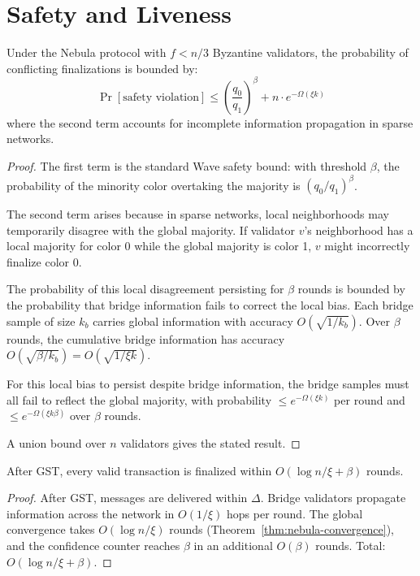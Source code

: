\section{Safety and Liveness}

\label{sec:safety}

\begin{theorem}
\label{thm:nebula-safety}
Under the Nebula protocol with $f < n/3$ Byzantine validators, the probability of
conflicting finalizations is bounded by:
\[
\Pr[\text{safety violation}] \leq \left(\frac{q_0}{q_1}\right)^{\beta} + n \cdot e^{-\Omega(\xi k)}
\]
where the second term accounts for incomplete information propagation in sparse networks.
\end{theorem}

\begin{proof}
The first term is the standard Wave safety bound: with threshold $\beta$, the probability
of the minority color overtaking the majority is $(q_0/q_1)^\beta$.

The second term arises because in sparse networks, local neighborhoods may temporarily
disagree with the global majority. If validator $v$'s neighborhood has a local majority
for color 0 while the global majority is color 1, $v$ might incorrectly finalize color 0.

The probability of this local disagreement persisting for $\beta$ rounds is bounded by
the probability that bridge information fails to correct the local bias. Each bridge
sample of size $k_b$ carries global information with accuracy $O(\sqrt{1/k_b})$. Over
$\beta$ rounds, the cumulative bridge information has accuracy $O(\sqrt{\beta / k_b}) = O(\sqrt{1/\xi k})$.

For this local bias to persist despite bridge information, the bridge samples must
all fail to reflect the global majority, with probability $\leq e^{-\Omega(\xi k)}$ per
round and $\leq e^{-\Omega(\xi k \beta)}$ over $\beta$ rounds.

A union bound over $n$ validators gives the stated result.
\end{proof}

\begin{lemma}
\label{lem:nebula-liveness}
After GST, every valid transaction is finalized within $O(\log n / \xi + \beta)$ rounds.
\end{lemma}

\begin{proof}
After GST, messages are delivered within $\Delta$. Bridge validators propagate
information across the network in $O(1/\xi)$ hops per round. The global convergence
takes $O(\log n / \xi)$ rounds (Theorem~\ref{thm:nebula-convergence}), and the
confidence counter reaches $\beta$ in an additional $O(\beta)$ rounds. Total:
$O(\log n / \xi + \beta)$.
\end{proof}


